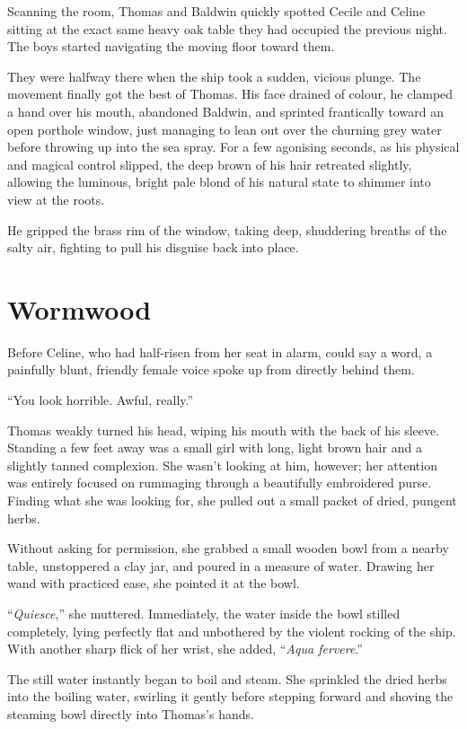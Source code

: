 Scanning the room, Thomas and Baldwin quickly spotted Cecile and Celine sitting at the exact same heavy oak table they had occupied the previous night. The boys started navigating the moving floor toward them.

They were halfway there when the ship took a sudden, vicious plunge. The movement finally got the best of Thomas. His face drained of colour, he clamped a hand over his mouth, abandoned Baldwin, and sprinted frantically toward an open porthole window, just managing to lean out over the churning grey water before throwing up into the sea spray. For a few agonising seconds, as his physical and magical control slipped, the deep brown of his hair retreated slightly, allowing the luminous, bright pale blond of his natural state to shimmer into view at the roots.

He gripped the brass rim of the window, taking deep, shuddering breaths of the salty air, fighting to pull his disguise back into place.

\section*{Wormwood}

Before Celine, who had half-risen from her seat in alarm, could say a word, a painfully blunt, friendly female voice spoke up from directly behind them.

\enquote{You look horrible. Awful, really.}

Thomas weakly turned his head, wiping his mouth with the back of his sleeve. Standing a few feet away was a small girl with long, light brown hair and a slightly tanned complexion. She wasn't looking at him, however; her attention was entirely focused on rummaging through a beautifully embroidered purse. Finding what she was looking for, she pulled out a small packet of dried, pungent herbs.

Without asking for permission, she grabbed a small wooden bowl from a nearby table, unstoppered a clay jar, and poured in a measure of water. Drawing her wand with practiced ease, she pointed it at the bowl.

\enquote{\textit{Quiesce},} she muttered. Immediately, the water inside the bowl stilled completely, lying perfectly flat and unbothered by the violent rocking of the ship. With another sharp flick of her wrist, she added, \enquote{\textit{Aqua fervere}.}

The still water instantly began to boil and steam. She sprinkled the dried herbs into the boiling water, swirling it gently before stepping forward and shoving the steaming bowl directly into Thomas's hands.

